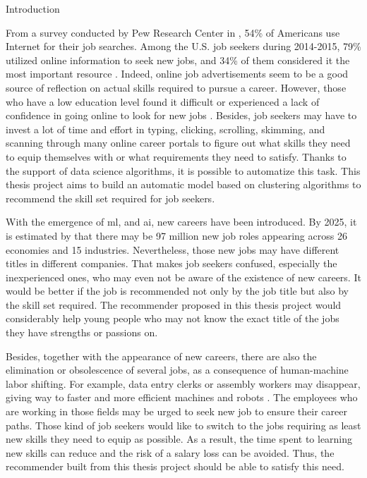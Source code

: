 \documentclass[a4paper,man,floatsintext,natbib,noextraspace]{apa6}
\makeatletter
\renewcommand{\section}{\@startsection {section}{1}
  {\z@}
  {\b@level@one@skip}
  {\e@level@one@skip}
  {\centering\normalfont\bfseries}}
\makeatother
\begin{document}
\setcounter{page}{1}

\printglossary[type=\acronymtype,style=altlist,title=List of Acronyms]

\clearpage

\section{Introduction}

From a survey conducted by Pew Research Center in \citeyear{smithSearchingWorkDigital2015}, 54\% of Americans use Internet for their job searches. Among the U.S. job seekers during 2014-2015, 79\% utilized online information to seek new jobs, and 34\% of them considered it the most important resource \citep{smithSearchingWorkDigital2015}. Indeed, online job advertisements seem to be a good source of reflection on actual skills required to pursue a career. However, those who have a low education level found it difficult or experienced a lack of confidence in going online to look for new jobs \citep{smithSearchingWorkDigital2015}. Besides, job seekers may have to invest a lot of time and effort in typing, clicking, scrolling, skimming, and scanning through many online career portals to figure out what skills they need to equip themselves with or what requirements they need to satisfy. Thanks to the support of data science algorithms, it is possible to automatize this task. This thesis project aims to build an automatic model based on clustering algorithms to recommend the skill set required for job seekers.

With the emergence of \gls{ml}, and \gls{ai}, new careers have been introduced. By 2025, it is estimated by \cite{worldeconomicforumFutureJobsReport2020} that there may be 97 million new job roles appearing across 26 economies and 15 industries. Nevertheless, those new jobs may have different titles in different companies. That makes job seekers confused, especially the inexperienced ones, who may even not be aware of the existence of new careers. It would be better if the job is recommended not only by the job title but also by the skill set required. The recommender proposed in this thesis project would considerably help young people who may not know the exact title of the jobs they have strengths or passions on. 

Besides, together with the appearance of new careers, there are also the elimination or obsolescence of several jobs, as a consequence of human-machine labor shifting. For example, data entry clerks or assembly workers may disappear, giving way to faster and more efficient machines and robots \citep{worldeconomicforumFutureJobsReport2020}. The employees who are working in those fields may be urged to seek new job to ensure their career paths. Those kind of job seekers would like to switch to the jobs requiring as least new skills they need to equip as possible. As a result, the time spent to learning new skills can reduce and the risk of a salary loss can be avoided. Thus, the recommender built from this thesis project should be able to satisfy this need.
\end{document}
